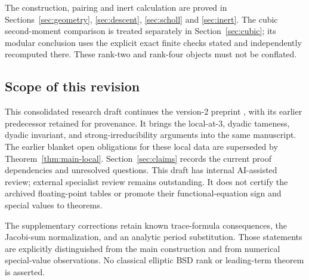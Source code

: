 The construction, pairing and inert calculation are proved in
Sections~\ref{sec:geometry}, \ref{sec:descent}, \ref{sec:scholl} and \ref{sec:inert}.
The cubic second-moment comparison is treated separately in
Section~\ref{sec:cubic}; its modular conclusion uses the explicit exact
finite checks stated and independently recomputed there. These rank-two and rank-four objects
must not be conflated.

\subsection{Scope of this revision}
This consolidated research draft continues the version-2 preprint
\cite{WalkeV2}, with its earlier predecessor \cite{WalkeV1} retained for
provenance. It brings the local-at-$3$, dyadic tameness, dyadic invariant,
and strong-irreducibility arguments into the same manuscript.
The earlier blanket open obligations for these local data are superseded
by Theorem~\ref{thm:main-local}. Section~\ref{sec:claims} records the
current proof dependencies and unresolved questions. This draft has
internal AI-assisted review; external specialist review remains outstanding.
It does not certify the archived floating-point tables or promote their
functional-equation sign and special values to theorems.

The supplementary corrections retain known trace-formula consequences,
the Jacobi-sum normalization, and an analytic period substitution. Those
statements are explicitly distinguished from the main construction and
from numerical special-value observations. No classical elliptic BSD rank
or leading-term theorem is asserted.
